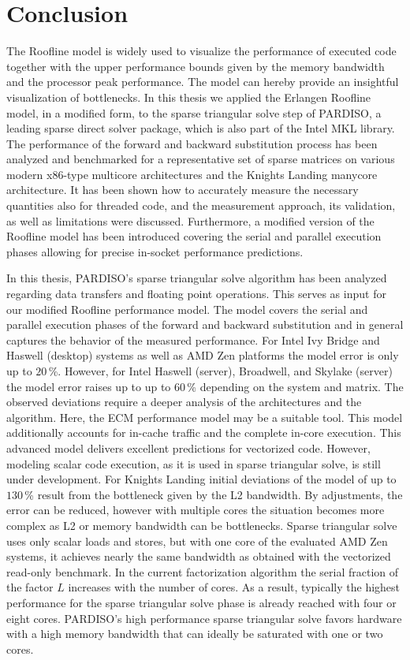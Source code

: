 \chapter{Conclusion}
\label{sec:conclusion}

The Roofline model is widely used to visualize the performance of executed code together with the upper performance bounds given by the memory bandwidth and the processor peak performance. The model can hereby provide an insightful visualization of bottlenecks. In this thesis we applied the Erlangen Roofline model, in a modified form, to the sparse triangular solve step of PARDISO, a leading sparse direct solver package, which is also part of the Intel MKL library. The performance of the forward and backward substitution process has been analyzed and benchmarked for a representative set of sparse matrices on various modern x86-type multicore architectures and the Knights Landing manycore architecture. It has been shown how to accurately measure the necessary quantities also for threaded code, and the measurement approach, its validation, as well as limitations were discussed. Furthermore, a modified version of the Roofline model has been introduced covering the serial and parallel execution phases allowing for precise in-socket performance predictions.

In this thesis, PARDISO's sparse triangular solve algorithm has been analyzed regarding data transfers and floating point operations. This serves as input for our modified Roofline performance model. The model covers the serial and parallel execution phases of the forward and backward substitution and in general captures the behavior of the measured
performance. For Intel Ivy Bridge and Haswell (desktop) systems as well as AMD Zen platforms the model error is only up to $20$\,\%. However, for Intel Haswell (server), Broadwell, and Skylake (server) the model error raises up to up to $60$\,\% depending on the system and matrix. The observed deviations require a deeper analysis
of the architectures and the algorithm. Here, the ECM performance
model may be a suitable tool. This model additionally accounts for in-cache traffic and the complete in-core execution. This advanced model delivers excellent predictions for vectorized code. However, modeling scalar code execution, as it is used in sparse triangular solve, is still under development. For Knights Landing initial deviations of the model
of up to $130$\,\% result from the bottleneck given by the L2 bandwidth.
By adjustments, the error can be reduced, however with multiple cores the situation becomes more complex as L2 or memory bandwidth can be bottlenecks. Sparse triangular solve uses only scalar loads and stores, but with one core of the evaluated AMD Zen systems, it achieves nearly the same bandwidth as obtained with the vectorized read-only benchmark. In the current factorization algorithm the serial fraction of the factor $L$
increases with the number of cores. As a result, typically the highest performance for the sparse triangular solve phase is already reached with four or eight cores.
PARDISO's high performance sparse triangular solve favors hardware with a high
memory bandwidth that can ideally be saturated with one or two cores.
